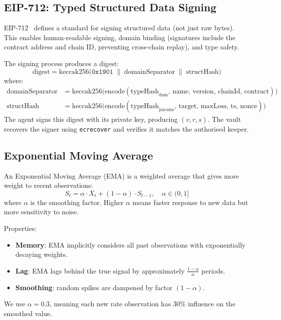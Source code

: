 \documentclass[12pt]{article}
\begin{document}
\subsection{EIP-712: Typed Structured Data Signing}
\label{sec:eip712}

EIP-712~\cite{eip712} defines a standard for signing structured data (not just raw bytes).
This enables human-readable signing, domain binding (signatures include the contract address and chain ID, preventing cross-chain replay), and type safety.

The signing process produces a digest:
\begin{equation}
  \text{digest} = \text{keccak256}\!\big(\texttt{0x1901} \;\|\; \text{domainSeparator} \;\|\; \text{structHash}\big)
  \label{eq:eip712-digest}
\end{equation}
where:
\begin{align}
  \text{domainSeparator} &= \text{keccak256}\!\big(\text{encode}(\text{typeHash}_{\text{dom}},\, \text{name},\, \text{version},\, \text{chainId},\, \text{contract})\big) \label{eq:domain-sep} \\[4pt]
  \text{structHash} &= \text{keccak256}\!\big(\text{encode}(\text{typeHash}_{\text{params}},\, \text{target},\, \text{maxLoss},\, \text{ts},\, \text{nonce})\big) \label{eq:struct-hash}
\end{align}
The agent signs this digest with its private key, producing $(v, r, s)$.
The vault recovers the signer using \texttt{ecrecover} and verifies it matches the authorised keeper.

\subsection{Exponential Moving Average}

An Exponential Moving Average (EMA) is a weighted average that gives more weight to recent observations:
\begin{equation}
  S_t = \alpha \cdot X_t + (1 - \alpha) \cdot S_{t-1}, \quad \alpha \in (0, 1]
  \label{eq:ema}
\end{equation}
where $\alpha$ is the smoothing factor.
Higher $\alpha$ means faster response to new data but more sensitivity to noise.

Properties:
\begin{itemize}[nosep]
  \item \textbf{Memory}: EMA implicitly considers all past observations with exponentially decaying weights.
  \item \textbf{Lag}: EMA lags behind the true signal by approximately $\frac{1-\alpha}{\alpha}$ periods.
  \item \textbf{Smoothing}: random spikes are dampened by factor $(1-\alpha)$.
\end{itemize}
We use $\alpha = 0.3$, meaning each new rate observation has 30\% influence on the smoothed value.
\end{document}
